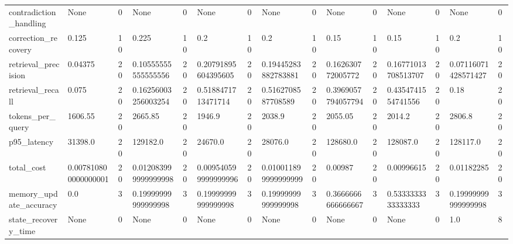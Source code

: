 \begin{tabular}{lllllllllllllll}
contradiction\_handling & None & 0 & None & 0 & None & 0 & None & 0 & None & 0 & None & 0 & None & 0 \\
correction\_recovery & 0.125 & 10 & 0.225 & 10 & 0.2 & 10 & 0.2 & 10 & 0.15 & 10 & 0.15 & 10 & 0.2 & 10 \\
retrieval\_precision & 0.04375 & 20 & 0.10555555555555556 & 20 & 0.20791895604395605 & 20 & 0.19445283882783881 & 20 & 0.162630772005772 & 20 & 0.16771013708513707 & 20 & 0.07116071428571427 & 20 \\
retrieval\_recall & 0.075 & 20 & 0.16256003256003254 & 20 & 0.5188471713471714 & 20 & 0.5162708587708589 & 20 & 0.3969057794057794 & 20 & 0.4354741554741556 & 20 & 0.18 & 20 \\
tokens\_per\_query & 1606.55 & 20 & 2665.85 & 20 & 1946.9 & 20 & 2038.9 & 20 & 2055.05 & 20 & 2014.2 & 20 & 2806.8 & 20 \\
p95\_latency & 31398.0 & 20 & 129182.0 & 20 & 24670.0 & 20 & 28076.0 & 20 & 128680.0 & 20 & 128087.0 & 20 & 128117.0 & 20 \\
total\_cost & 0.007810800000000001 & 20 & 0.012083999999999998 & 20 & 0.009540599999999996 & 20 & 0.010011899999999999 & 20 & 0.00987 & 20 & 0.00996615 & 20 & 0.01182285 & 20 \\
memory\_update\_accuracy & 0.0 & 3 & 0.19999999999999998 & 3 & 0.19999999999999998 & 3 & 0.19999999999999998 & 3 & 0.3666666666666667 & 3 & 0.5333333333333333 & 3 & 0.19999999999999998 & 3 \\
state\_recovery\_time & None & 0 & None & 0 & None & 0 & None & 0 & None & 0 & None & 0 & 1.0 & 8 \\
\end{tabular}
